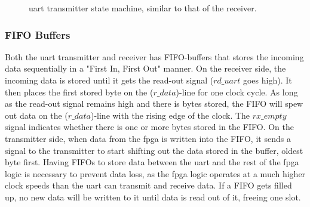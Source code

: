 \documentclass[main.tex]{subfiles}
\begin{document}
\begin{figure}[!ht]
\begin{center}
\caption{\gls{uart} transmitter state machine, similar to that of the receiver.}
\label{fig:uarttx}
\end{center}
\end{figure}

\subsubsection{FIFO Buffers}
Both the \gls{uart} transmitter and receiver has FIFO-buffers that stores the incoming data sequentially in a "First In, First Out" manner. On the receiver side, the incoming data is stored until it gets the read-out signal ($rd\_uart$ goes high). It then places the first stored byte on the ($r\_data$)-line for one clock cycle. As long as the read-out signal remains high and there is bytes stored, the FIFO will spew out data on the ($r\_data$)-line with the rising edge of the clock. The $rx\_empty$ signal indicates whether there is one or more bytes stored in the FIFO. On the transmitter side, when data from the \gls{fpga} is written into the FIFO, it sends a signal to the transmitter to start shifting out the data stored in the buffer, oldest byte first. Having FIFOs to store data between the \gls{uart} and the rest of the \gls{fpga} logic is necessary to prevent data loss, as the \gls{fpga} logic operates at a much higher clock speeds than the \gls{uart}  can transmit and receive data. If a FIFO gets filled up, no new data will be written to it until data is read out of it, freeing one slot.
\end{document}
